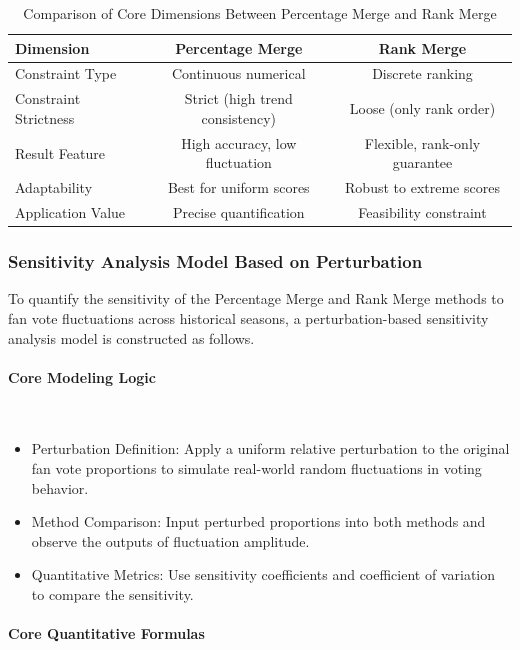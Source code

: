 \documentclass{mcmthesis}
\begin{document}
\begin{table}[H]
\centering
\caption{Comparison of Core Dimensions Between Percentage Merge and Rank Merge}
\label{tab:method_compare}
\setlength{\tabcolsep}{0.8mm} %
\scriptsize %
\begin{tabular}{lcc}
\toprule
\textbf{Dimension} & \textbf{Percentage Merge} & \textbf{Rank Merge} \\
\midrule
Constraint Type & Continuous numerical & Discrete ranking \\
Constraint Strictness & Strict (high trend consistency) & Loose (only rank order) \\
Result Feature & High accuracy, low fluctuation & Flexible, rank-only guarantee \\
Adaptability & Best for uniform scores & Robust to extreme scores \\
Application Value & Precise quantification & Feasibility constraint \\
\bottomrule
\end{tabular}
\end{table}

\subsubsection{Sensitivity Analysis Model Based on Perturbation}
To quantify the sensitivity of the Percentage Merge and Rank Merge methods to fan vote fluctuations across historical seasons, a perturbation-based sensitivity analysis model is constructed as follows.
\paragraph{Core Modeling Logic}\hfill\\
\begin{itemize}
\item Perturbation Definition: Apply a uniform relative perturbation to the original fan vote proportions to simulate real-world random fluctuations in voting behavior.
\item Method Comparison: Input perturbed proportions into both methods and observe the outputs of fluctuation amplitude.
\item Quantitative Metrics: Use sensitivity coefficients and coefficient of variation to compare the sensitivity.
\end{itemize}

\paragraph{Core Quantitative Formulas}\hfill\\
\end{document}
